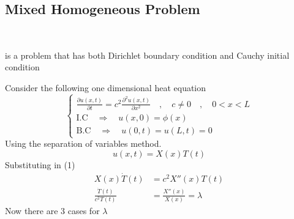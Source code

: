\documentclass[]{article}
\begin{document}
\subsection{Mixed Homogeneous Problem}
\ 
\begin{definition}
    is a problem that has both Dirichlet boundary condition and Cauchy initial condition
\end{definition}
Consider the following one dimensional heat equation 
\begin{equation}
    \begin{cases}
        \displaystyle \frac{\partial u(x,t)}{\partial t} = c^2\frac{\partial^2 u(x,t)}{\partial x^2} \quad,\quad c\neq0 \quad,\quad 0<x<L
        \\
        \text{I.C} \quad \Longrightarrow \quad u(x,0) = \phi(x)
        \\
        \text{B.C} \quad \Longrightarrow \quad u(0,t) = u(L,t) = 0
    \end{cases}
\end{equation}
Using the separation of variables method.
\begin{equation}
u(x,t) = X(x)T(t)
\end{equation}
Substituting in (1)
\begin{align*}
X(x)\dot{T}(t) &= c^2 X''(x)T(t)
\\
\frac{\dot{T}(t)}{c^2 T(t)} &= \frac{X''(x)}{X(x)} = \lambda
\end{align*}
Now there are 3 cases for $\lambda$
\end{document}
